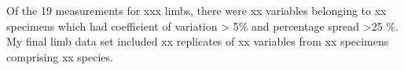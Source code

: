 Of the 19 measurements for xxx limbs, there were xx variables belonging to xx specimens which had coefficient of variation > 5\% and percentage spread >25 \%. My final limb data set included xx replicates of xx variables from xx specimens comprising xx species.

\subsection{}
